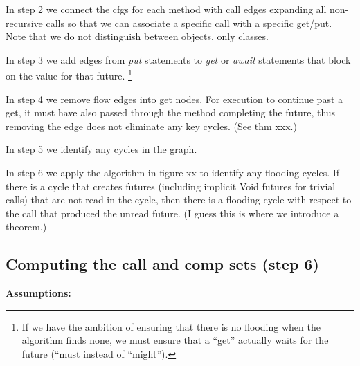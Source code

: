 \documentclass[12pt]{article}%
\begin{document}
In step 2 we connect the cfgs for each method with call edges expanding all non-recursive calls so that we can
associate a specific call with a specific get/put. Note that we do not distinguish between objects, only classes.

In step 3 we add edges from \emph{put} statements to \emph{get} or \emph{await} statements that block on the value for that future.
\footnote{If we have the ambition of ensuring that 
there is no flooding when the algorithm finds none,
we must ensure that a ``get'' actually waits for the future
(``must instead of ``might'').}

In step 4 we remove flow edges into get nodes. For execution to continue past a get, it must have also passed through the
method completing the future, thus removing the edge does not eliminate any key cycles. (See thm xxx.)

In step 5 we identify any cycles in the graph.

In step 6 we apply the algorithm in figure xx to identify any flooding cycles.
If there is a cycle that creates futures (including implicit Void futures for trivial calls) that are not read
in the cycle, then there is a flooding-cycle with respect to the call that produced the unread future. 
(I guess this is where we introduce a theorem.)

\subsection{Computing the call and comp sets (step 6)}

\textbf{Assumptions:}
\end{document}
